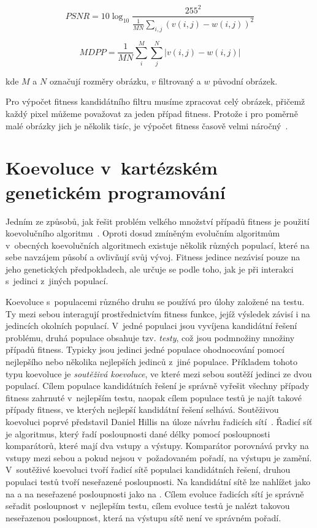 \begin{equation}
    \label{eqPSNR}
    \mathit{PSNR} = 10 \log_{10} \frac{255^2}{\frac{1}{MN} \sum\limits_{i,j} \left( v\left( i, j \right) - w\left( i, j \right)  \right)^2 }
\end{equation}

\begin{equation}
    \label{eqMDPP}
    \mathit{MDPP} = \frac{1}{MN} \sum\limits_i^M \sum\limits_j^N \left| v\left( i, j \right) - w\left( i, j \right) \right|
\end{equation}

\noindent{}kde $M$ a $N$ označují rozměry obrázku, $v$ filtrovaný a $w$ původní obrázek.

Pro výpočet fitness kandidátního filtru musíme zpracovat celý obrázek, přičemž každý pixel můžeme považovat za jeden případ fitness. Protože i pro poměrně malé obrázky jich je několik tisíc, je výpočet fitness časově velmi náročný~\cite{Modra, ZelenaIF}.

\section{Koevoluce v~kartézském genetickém programování}
\label{secCoev}

Jedním ze způsobů, jak řešit problém velkého množství případů fitness je použití koevolučního algoritmu~\cite{HandbookCoev}. Oproti dosud zmíněným evolučním algoritmům v~obecných koevolučních algoritmech existuje několik různých populací, které na sebe navzájem působí a ovlivňují svůj vývoj. Fitness jedince nezávisí pouze na jeho genetických předpokladech, ale určuje se podle toho, jak  je při interakci s~jedinci z~jiných populací.

Koevoluce s~populacemi různého druhu se používá pro úlohy založené na testu. Ty mezi sebou interagují prostřednictvím fitness funkce, jejíž výsledek závisí i na jedincích okolních populací. V~jedné populaci jsou vyvíjena kandidátní řešení problému, druhá populace obsahuje tzv. \emph{testy}, což jsou podmnožiny množiny případů fitness. Typicky jsou jedinci jedné populace ohodnocování pomocí nejlepšího nebo několika nejlepších jedinců z~jiné populace. Příkladem tohoto typu koevoluce je \emph{soutěživá koevoluce}, ve které mezi sebou soutěží jedinci ze dvou populací. Cílem populace kandidátních řešení je správně vyřešit všechny případy fitness zahrnuté v~nejlepším testu, naopak cílem populace testů je najít takové případy fitness, ve kterých nejlepší kandidátní řešení selhává. Soutěživou koevoluci poprvé představil Daniel Hillis na úloze návrhu řadicích sítí~\cite{Hillis}. Řadicí síť je algoritmus, který řadí posloupnosti dané délky pomocí posloupnosti komparátorů, které mají dva vstupy a výstupy. Komparátor porovnává prvky na vstupy mezi sebou a pokud nejsou v~požadovaném pořadí, na výstupu je zamění. V~soutěživé koevoluci tvoří řadicí sítě populaci kandidátních řešení, druhou populaci testů tvoří neseřazené posloupnosti. Na kandidátní sítě lze nahlížet jako na  a na neseřazené posloupnosti jako na . Cílem evoluce řadicích sítí je správně seřadit posloupnost v~nejlepším testu, cílem evoluce testů je nalézt takovou neseřazenou posloupnost, která na výstupu sítě není ve správném pořadí.

